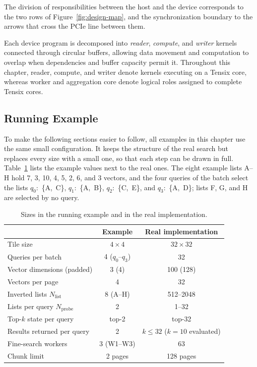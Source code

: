 The division of responsibilities between the host and the device corresponds to the two rows of Figure~\ref{fig:design-map}, and the synchronization boundary to the arrows that cross the PCIe line between them.


Each device program is decomposed into \emph{reader}, \emph{compute}, and \emph{writer} kernels connected through circular buffers, allowing data movement and computation to overlap when dependencies and buffer capacity permit it. Throughout this chapter, reader, compute, and writer denote kernels executing on a Tensix core, whereas worker and aggregation core denote logical roles assigned to complete Tensix cores.

\subsection{Running Example}
\label{subsec:running-example}

To make the following sections easier to follow, all examples in this chapter use the same small configuration. It keeps the structure of the real search but replaces every size with a small one, so that each step can be drawn in full. Table~\ref{tab:running-example} lists the example values next to the real ones. The eight example lists A--H hold 7, 3, 10, 4, 5, 2, 6, and 3 vectors, and the four queries of the batch select the lists \(q_0\):~\{A,~C\}, \(q_1\):~\{A,~B\}, \(q_2\):~\{C,~E\}, and \(q_3\):~\{A,~D\}; lists F, G, and H are selected by no query.

\begin{table}[htbp]
\centering
\small
\caption{Sizes in the running example and in the real implementation.}
\label{tab:running-example}
\begin{tabular}{lcc}
\toprule
& Example & Real implementation \\
\midrule
Tile size & \(4\times4\) & \(32\times32\) \\
Queries per batch & 4 (\(q_0\)--\(q_3\)) & 32 \\
Vector dimensions (padded) & 3 (4) & 100 (128) \\
Vectors per page & 4 & 32 \\
Inverted lists \(N_{\mathrm{list}}\) & 8 (A--H) & 512--2048 \\
Lists per query \(N_{\mathrm{probe}}\) & 2 & 1--32 \\
Top-\(k\) state per query & top-2 & top-32 \\
Results returned per query & 2 & \(k\le32\) (\(k=10\) evaluated) \\
Fine-search workers & 3 (W1--W3) & 63 \\
Chunk limit & 2 pages & 128 pages \\
\bottomrule
\end{tabular}
\end{table}

